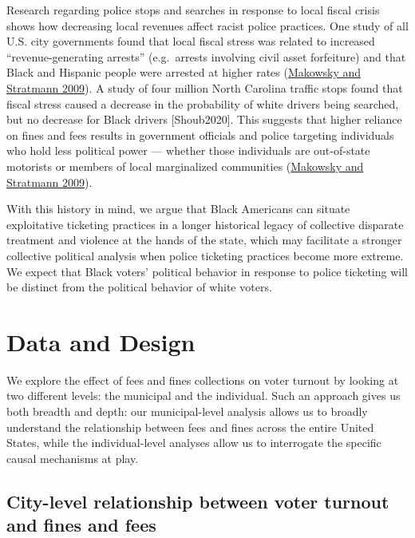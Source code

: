 \documentclass[
  12pt,
]{article}
\begin{document}
Research regarding police stops and searches in response to local fiscal crisis shows how decreasing local revenues affect racist police practices. One study of all U.S. city governments found that local fiscal stress was related to increased ``revenue-generating arrests'' (e.g.~arrests involving civil asset forfeiture) and that Black and Hispanic people were arrested at higher rates (\protect\hyperlink{ref-Makowsky2009}{Makowsky and Stratmann 2009}). A study of four million North Carolina traffic stops found that fiscal stress caused a decrease in the probability of white drivers being searched, but no decrease for Black drivers {[}Shoub2020{]}. This suggests that higher reliance on fines and fees results in government officials and police targeting individuals who hold less political power --- whether those individuals are out-of-state motorists or members of local marginalized communities (\protect\hyperlink{ref-Makowsky2009}{Makowsky and Stratmann 2009}).

With this history in mind, we argue that Black Americans can situate exploitative ticketing practices in a longer historical legacy of collective disparate treatment and violence at the hands of the state, which may facilitate a stronger collective political analysis when police ticketing practices become more extreme. We expect that Black voters' political behavior in response to police ticketing will be distinct from the political behavior of white voters.

\hypertarget{data-and-design}{%
\section*{Data and Design}\label{data-and-design}}

We explore the effect of fees and fines collections on voter turnout by looking at two different levels: the municipal and the individual. Such an approach gives us both breadth and depth: our municipal-level analysis allows us to broadly understand the relationship between fees and fines across the entire United States, while the individual-level analyses allow us to interrogate the specific causal mechanisms at play.

\hypertarget{city-level-relationship-between-voter-turnout-and-fines-and-fees}{%
\subsection*{City-level relationship between voter turnout and fines and fees}\label{city-level-relationship-between-voter-turnout-and-fines-and-fees}}
\end{document}
